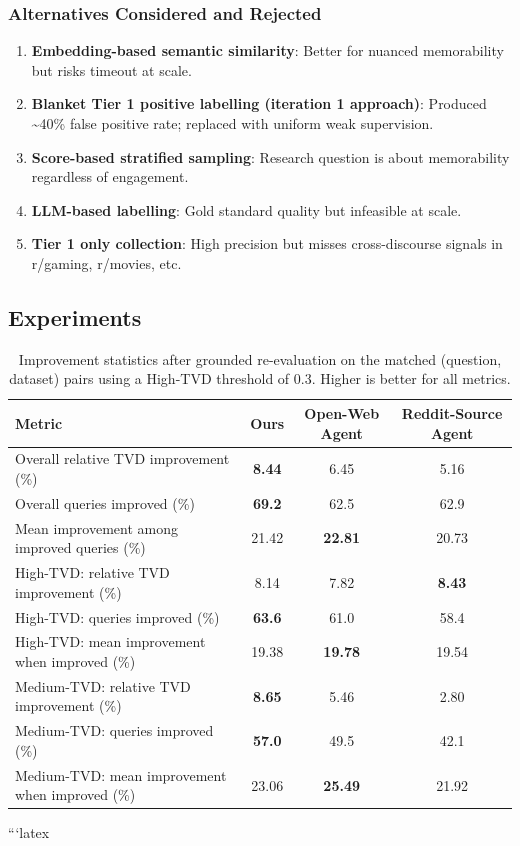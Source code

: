 \subsubsection{Alternatives Considered and Rejected}
\begin{enumerate}
    \item \textbf{Embedding-based semantic similarity}: Better for nuanced memorability but risks timeout at scale.
    \item \textbf{Blanket Tier 1 positive labelling (iteration 1 approach)}: Produced \textasciitilde40\% false positive rate; replaced with uniform weak supervision.
    \item \textbf{Score-based stratified sampling}: Research question is about memorability regardless of engagement.
    \item \textbf{LLM-based labelling}: Gold standard quality but infeasible at scale.
    \item \textbf{Tier 1 only collection}: High precision but misses cross-discourse signals in r/gaming, r/movies, etc.
\end{enumerate}



\subsection*{Experiments}

\begin{table}[t]
\centering
\small
\setlength{\tabcolsep}{6pt}

\label{tab:improvement_stats_t03}
\begin{tabular}{lccc}
\toprule
Metric & Ours & Open-Web Agent & Reddit-Source Agent \\
\midrule
Overall relative TVD improvement (\%) & \textbf{8.44} & 6.45 & 5.16 \\
Overall queries improved (\%) & \textbf{69.2} & 62.5 & 62.9 \\
Mean improvement among improved queries (\%) & 21.42 & \textbf{22.81} & 20.73 \\
\midrule
High-TVD: relative TVD improvement (\%) & 8.14 & 7.82 & \textbf{8.43} \\
High-TVD: queries improved (\%) & \textbf{63.6} & 61.0 & 58.4 \\
High-TVD: mean improvement when improved (\%) & 19.38 & \textbf{19.78} & 19.54 \\
\midrule
Medium-TVD: relative TVD improvement (\%) & \textbf{8.65} & 5.46 & 2.80 \\
Medium-TVD: queries improved (\%) & \textbf{57.0} & 49.5 & 42.1 \\
Medium-TVD: mean improvement when improved (\%) & 23.06 & \textbf{25.49} & 21.92 \\
\bottomrule
\end{tabular}
\caption{Improvement statistics after grounded re-evaluation on the matched (question, dataset) pairs using a High-TVD threshold of 0.3. Higher is better for all metrics.}
\end{table}
```latex
